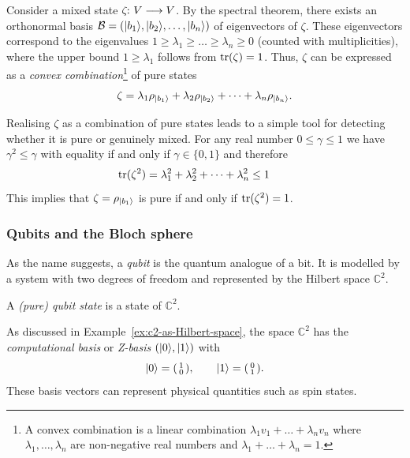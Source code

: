 \documentclass[a4paper, oneside, 12pt]{amsart}
\begin{document}
\begin{remark}\label{rmk:mixed-states-are-convex-coms-of-pure-state}
  Consider a mixed state \(\zeta \from V\to V\).
  By the spectral theorem, there exists an orthonormal basis
  \(\mathcal{B}= (\lvert b_{1}\rangle, \lvert b_{2}\rangle, \dots , \lvert b_{n}\rangle)\) of eigenvectors of \(\zeta\).
  These eigenvectors correspond to the eigenvalues \(1\geq\lambda_{1}\geq  \dots \geq \lambda_{n} \geq 0\) (counted with multiplicities), where the upper bound \(1\geq \lambda_{1}\) follows from \(\operatorname{tr}(\zeta) = 1\).
  Thus, \(\zeta\) can be expressed as a \emph{convex combination}\footnote{%
    A convex combination is a linear combination \(\lambda_{1} v_{1} + \dots + \lambda_{n} v_{n}\) where \(\lambda_{1}, \dots , \lambda_{n}\) are non-negative real numbers and \(\lambda_{1} + \dots + \lambda_{n} =1\).
  } of pure states
  \begin{equation*}
    \zeta = \lambda_{1}\rho_{\lvert b_{1}\rangle} + \lambda_{2}\rho_{\lvert b_{2}\rangle} + \dots + \lambda_{n}\rho_{\lvert b_{n}\rangle}.
  \end{equation*}

  Realising \(\zeta\) as a combination of pure states leads to a simple tool for detecting whether it is pure or genuinely mixed.
  For any real number \(0 \leq \gamma \leq 1\) we have \(\gamma^{2}\leq \gamma\) with equality if and only if \(\gamma \in\{0,1\}\) and therefore
  \begin{equation*}
    \operatorname{tr}(\zeta^{2}) = \lambda_{1}^{2} + \lambda_{2}^{2} + \dots + \lambda_{n}^{2} \leq 1 \qquad
  \end{equation*}
  This implies that \(\zeta = \rho_{\lvert b_{1}\rangle}\) is pure if and only if \(\operatorname{tr}(\zeta^{2}) = 1\).
\end{remark}


\subsubsection{Qubits and the Bloch sphere}\label{sec:qubits-and-the-bloch-sphere}

As the name suggests, a \emph{qubit} is the quantum analogue of a bit.
It is modelled by a system with two degrees of freedom and represented by the Hilbert space \( \mathbb{C}^2 \).

\begin{definition}\label{def:qubit}
  A \emph{(pure) qubit state} is a state of \( \mathbb{C}^2 \).
\end{definition}

As discussed in Example~\ref{ex:c2-as-Hilbert-space}, the space \( \mathbb{C}^2 \) has the \emph{computational basis} or \emph{Z-basis}  \((\lvert0\rangle, \lvert1\rangle)\) with
\begin{equation*}
  \lvert0\rangle = \begin{psmallmatrix} 1 \\ 0 \end{psmallmatrix}, \qquad
  \lvert1\rangle = \begin{psmallmatrix} 0 \\ 1 \end{psmallmatrix}.
\end{equation*}
These basis vectors can represent physical quantities such as spin states.
\bigskip
\end{document}

